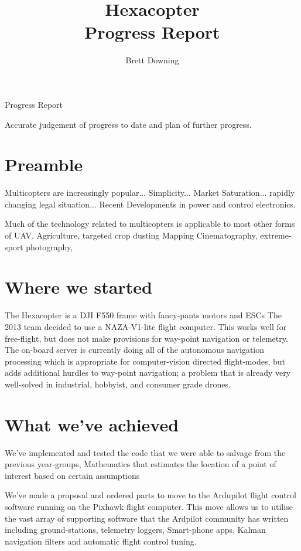 \documentclass[11pt]{article}
\title{Hexacopter\\
	Progress Report}
\author{Brett Downing}
\date{}
\begin{document}
  \maketitle

  Progress Report
  
  Accurate judgement of progress to date and plan of further progress.

  \section{Preamble}
  Multicopters are increasingly popular... Simplicity... Market Saturation... rapidly changing legal situation... 
  Recent Developments in power and control electronics. 

  Much of the technology related to multicopters is applicable to most other forms of UAV.
  Agriculture, targeted crop dusting
  Mapping
  Cinematography, extreme-sport photography, 


  \section{Where we started}
  The Hexacopter is a DJI F550 frame with fancy-pants motors and ESCs
  The 2013 team  decided to use a NAZA-V1-lite flight computer. This works well for free-flight, but does not make provisions for way-point navigation or telemetry.
  The on-board server is currently doing all of the autonomous navigation processing which is appropriate for computer-vision directed flight-modes, but adds additional hurdles to way-point navigation; a problem that is already very well-solved in industrial, hobbyist, and consumer grade drones.



  \section{What we've achieved}
  We've implemented and tested the code that we were able to salvage from the previous year-groups,
  Mathematics that estimates the location of a point of interest based on certain assumptions

  We've made a proposal and ordered parts to move to the Ardupilot flight control software running on the Pixhawk flight computer.
  This move allows us to utilise the vast array of supporting software that the Ardpilot community has written including ground-stations, telemetry loggers, Smart-phone apps, Kalman navigation filters and automatic flight control tuning.
\end{document}
